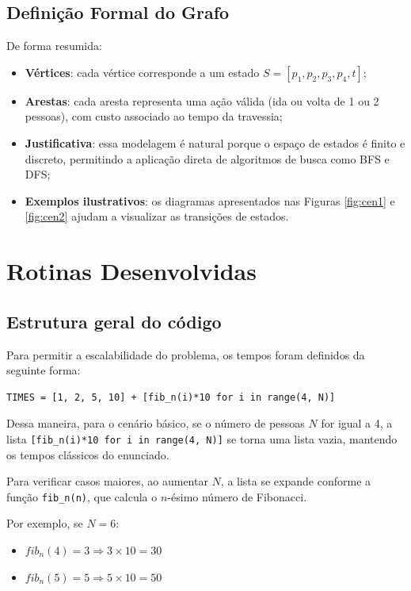 \documentclass[12pt,a4paper]{article}
\begin{document}
\subsection{Definição Formal do Grafo}
De forma resumida:
\begin{itemize}
\item \textbf{Vértices}: cada vértice corresponde a um estado $S = [p_1, p_2, p_3, p_4, t]$;
\item \textbf{Arestas}: cada aresta representa uma ação válida (ida ou volta de 1 ou 2 pessoas), com custo associado ao tempo da travessia;
\item \textbf{Justificativa}: essa modelagem é natural porque o espaço de estados é finito e discreto, permitindo a aplicação direta de algoritmos de busca como BFS e DFS;
\item \textbf{Exemplos ilustrativos}: os diagramas apresentados nas Figuras \ref{fig:cen1} e \ref{fig:cen2} ajudam a visualizar as transições de estados.
\end{itemize}

\section{Rotinas Desenvolvidas}

\subsection{Estrutura geral do código}

Para permitir a escalabilidade do problema, os tempos foram definidos da seguinte forma:

\begin{lstlisting}
TIMES = [1, 2, 5, 10] + [fib_n(i)*10 for i in range(4, N)]
\end{lstlisting}

Dessa maneira, para o cenário básico, se o número de pessoas $N$ for igual a 4, a lista
\texttt{[fib\_n(i)*10 for i in range(4, N)]} se torna uma lista vazia, mantendo os tempos clássicos do enunciado.

Para verificar casos maiores, ao aumentar $N$, a lista se expande conforme a função \texttt{fib\_n(n)}, que calcula o $n$-ésimo número de Fibonacci.

Por exemplo, se $N = 6$:
\begin{itemize}
    \item $fib_n(4) = 3 \Rightarrow 3 \times 10 = 30$
    \item $fib_n(5) = 5 \Rightarrow 5 \times 10 = 50$
\end{itemize}
\end{document}
